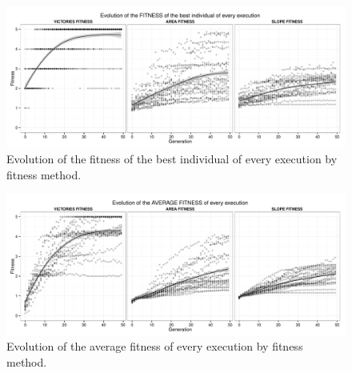 \documentclass[preprint]{elsarticle}
\begin{document}


 \begin{figure}[ht]
 \begin{center}
   \includegraphics[width=12cm]{nuevas_imgs/evolution_BEST_FITNESS.pdf}
 \end{center}
 \caption{Evolution of the fitness of the best individual of every execution by fitness method.}
 \label{fig:evolutionFitness}
 \end{figure}

 \begin{figure}[ht]
 \begin{center}
   \includegraphics[width=12cm]{nuevas_imgs/evolution_AVERAGE_FITNESS.pdf}
 \end{center}
 \caption{Evolution of the average fitness of every execution by fitness method.}
 \label{figura:evolutionFitnessAverage}
 \end{figure}
\end{document}
